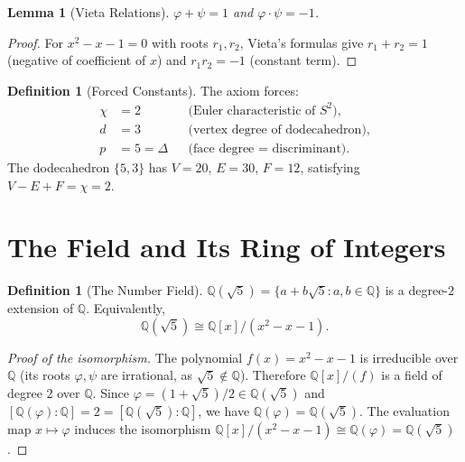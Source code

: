 \documentclass[11pt,a4paper]{article}
\theoremstyle{plain}
\newtheorem{lemma}[theorem]{Lemma}
\theoremstyle{definition}
\newtheorem{definition}[theorem]{Definition}
\newcommand{\Q}{\mathbb{Q}}
\newcommand{\vp}{\varphi}
\newcommand{\ps}{\psi}
\begin{document}
\begin{lemma}[Vieta Relations]\label{lem:vieta}
$\vp + \ps = 1$ and $\vp \cdot \ps = -1$.
\end{lemma}

\begin{proof}
For $x^{2} - x - 1 = 0$ with roots $r_{1}, r_{2}$, Vieta's formulas
give $r_{1} + r_{2} = 1$ (negative of coefficient of $x$) and
$r_{1} r_{2} = -1$ (constant term).
\end{proof}

\begin{definition}[Forced Constants]\label{def:forced}
The axiom forces:
\begin{align}
  \chi &= 2 && \text{(Euler characteristic of $S^{2}$)},\label{eq:chi}\\
  d &= 3 && \text{(vertex degree of dodecahedron)},\label{eq:d}\\
  p &= 5 = \Delta && \text{(face degree = discriminant)}.\label{eq:p}
\end{align}
The dodecahedron $\{5,3\}$ has $V = 20$, $E = 30$, $F = 12$,
satisfying $V - E + F = \chi = 2$.
\end{definition}

\section{The Field and Its Ring of Integers}\label{sec:field}

\begin{definition}[The Number Field]\label{def:field}
$\Q(\sqrt{5}) = \{a + b\sqrt{5} : a, b \in \Q\}$ is a degree-$2$
extension of $\Q$.  Equivalently,
\begin{equation}\label{eq:field-quotient}
  \Q(\sqrt{5}) \cong \Q[x]/(x^{2} - x - 1).
\end{equation}
\end{definition}

\begin{proof}[Proof of the isomorphism]
The polynomial $f(x) = x^{2} - x - 1$ is irreducible over $\Q$
(its roots $\vp, \ps$ are irrational, as $\sqrt{5} \notin \Q$).
Therefore $\Q[x]/(f)$ is a field of degree $2$ over $\Q$.  Since
$\vp = (1 + \sqrt{5})/2 \in \Q(\sqrt{5})$ and $[\Q(\vp):\Q] = 2
= [\Q(\sqrt{5}):\Q]$, we have $\Q(\vp) = \Q(\sqrt{5})$.
The evaluation map $x \mapsto \vp$ induces the isomorphism
$\Q[x]/(x^{2} - x - 1) \cong \Q(\vp) = \Q(\sqrt{5})$.
\end{proof}
\end{document}
